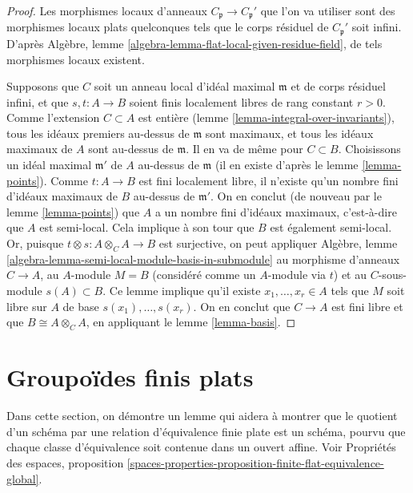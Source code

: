 \begin{proof}
\medskip\noindent
Les morphismes locaux d'anneaux $C_{\mathfrak p} \to C_{\mathfrak p}'$ que l'on va
utiliser sont des morphismes locaux plats quelconques tels que le corps résiduel de
$C_{\mathfrak p}'$ soit infini.
D'après Algèbre, lemme \ref{algebra-lemma-flat-local-given-residue-field},
de tels morphismes locaux existent.

\medskip\noindent
Supposons que $C$ soit un anneau local d'idéal maximal $\mathfrak m$ et
de corps résiduel infini, et que $s, t : A \to B$ soient
finis localement libres de rang constant $r > 0$.
Comme l'extension $C \subset A$ est entière (lemme \ref{lemma-integral-over-invariants}),
tous les idéaux premiers au-dessus de $\mathfrak m$ sont maximaux, et tous les idéaux maximaux
de $A$ sont au-dessus de $\mathfrak m$. Il en va de même pour $C \subset B$.
Choisissons un idéal maximal $\mathfrak m'$
de $A$ au-dessus de $\mathfrak m$ (il en existe d'après le lemme \ref{lemma-points}).
Comme $t : A \to B$ est fini localement libre, il n'existe qu'un nombre fini
d'idéaux maximaux de $B$ au-dessus de $\mathfrak m'$. On en conclut
(de nouveau par le lemme \ref{lemma-points})
que $A$ a un nombre fini d'idéaux maximaux, c'est-à-dire que
$A$ est semi-local. Cela implique à son tour que $B$ est également
semi-local. Or, puisque $t \otimes s : A \otimes_C A \to B$ est surjective,
on peut appliquer
Algèbre, lemme \ref{algebra-lemma-semi-local-module-basis-in-submodule}
au morphisme d'anneaux $C \to A$, au $A$-module $M = B$ (considéré comme un $A$-module
via $t$) et au $C$-sous-module $s(A) \subset B$. Ce lemme implique qu'il
existe $x_1, \ldots, x_r \in A$ tels que $M$ soit libre sur $A$
de base $s(x_1), \ldots, s(x_r)$. On en conclut que $C \to A$ est fini libre
et que $B \cong A \otimes_C A$, en appliquant
le lemme \ref{lemma-basis}.
\end{proof}



\section{Groupoïdes finis plats}
\label{section-finite-flat-general}

\noindent
Dans cette section, on démontre un lemme qui aidera à montrer que le quotient
d'un schéma par une relation d'équivalence finie plate est un schéma, pourvu que
chaque classe d'équivalence soit contenue dans un ouvert affine. Voir
Propriétés des espaces,
proposition \ref{spaces-properties-proposition-finite-flat-equivalence-global}.

